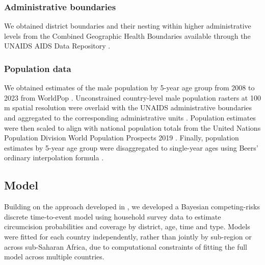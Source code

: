 \documentclass{article}
\begin{document}

\subsubsection*{Administrative boundaries }


We obtained district boundaries and their nesting within higher administrative levels from the Combined Geographic Health Boundaries available through the UNAIDS AIDS Data Repository \cite{UNAIDSADR}.


\subsubsection*{Population data}


We obtained estimates of the male population by 5-year age group from 2008 to 2023 from WorldPop \cite{worldpop}. Unconstrained country-level male population rasters at 100 m spatial resolution were overlaid with the UNAIDS administrative boundaries and aggregated to the corresponding administrative units \cite{UNAIDSADR}. Population estimates were then scaled to align with national population totals from the United Nations Population Division World Population Prospects 2019 \cite{wpp}. Finally, population estimates by 5-year age group were disaggregated to single-year ages using Beers' ordinary interpolation formula \cite{beersmethod, beers}.


\subsection*{Model}


Building on the approach developed in \cite{thomas2024substantial}, we developed a Bayesian competing-risks discrete time-to-event model \cite{putter2006tutorial} using household survey data to estimate circumcision probabilities and coverage by district, age, time and type. Models were fitted for each country independently, rather than jointly by sub-region or across sub-Saharan Africa, due to computational constraints of fitting the full model across multiple countries.
\end{document}
